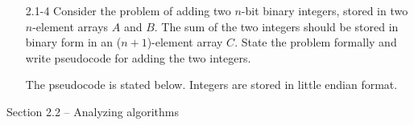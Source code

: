 \begin{enumerate}
\newpage

\item[2.1{-}4]{Consider the problem of adding two $n$-bit binary integers,
stored in two $n$-element arrays $A$ and $B$. The sum of the two integers should
be stored in binary form in an ($n + 1$)-element array $C$. State the problem
formally and write pseudocode for adding the two integers.}

\begin{framed}
The pseudocode is stated below. Integers are stored in little endian format.\\
\begin{algorithm}[H]
\SetAlgoNoEnd\DontPrintSemicolon
\BlankLine
{}
\end{algorithm}
\end{framed}

\end{enumerate}

\pagebreak

{\large Section 2.2 {--} Analyzing algorithms}

